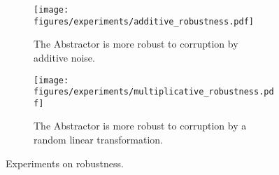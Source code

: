 \begin{figure}[ht]
    \centering
    \begin{subfigure}[t]{0.45\textwidth}
        \centering
        \texttt{[image: figures/experiments/additive\_robustness.pdf]}
        \caption{The Abstractor is more robust to corruption by additive noise. }\label{fig:exp_robustness1}
    \end{subfigure}\hspace{\fill}
    \begin{subfigure}[t]{0.45\textwidth}
        \centering
        \texttt{[image: figures/experiments/multiplicative\_robustness.pdf]}
        \caption{The Abstractor is more robust to corruption by a random linear transformation.}\label{fig:exp_robustness2}
    \end{subfigure}
    \caption{Experiments on robustness.}\label{fig:exp_robustness}
\end{figure}